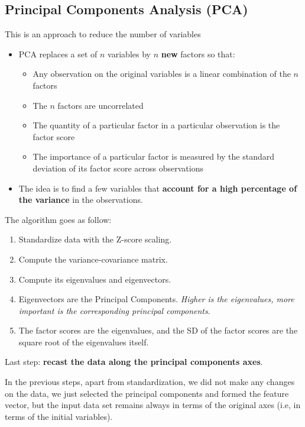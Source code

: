 \subsection{Principal Components Analysis (PCA)}

This is an approach to reduce the number of variables
\begin{itemize}
    \item PCA replaces a set of $n$ variables by $n$ \textbf{new} factors so that:
    \begin{itemize}
        \item Any observation on the original variables is a linear combination of the $n$ factors
        \item The $n$ factors are uncorrelated
        \item The quantity of a particular factor in a particular observation is the factor score
        \item The importance of a particular factor is measured by the standard deviation of its factor score across observations
    \end{itemize}
    \item The idea is to find a few variables that \textbf{account for a high percentage of the variance} in the observations.
\end{itemize}

The algorithm goes as follow:
\begin{enumerate}
    \item Standardize data with the Z-score scaling.
    \item Compute the variance-covariance matrix.
    \item Compute its eigenvalues and eigenvectors.
    \item Eigenvectors are the Principal Components. \textit{Higher is the eigenvalues, more important is the corresponding principal components}.
    \item The factor scores are the eigenvalues, and the SD of the factor scores are the square root of the eigenvalues itself.
\end{enumerate}

Last step: \textbf{recast the data along the principal components axes}.

In the previous steps, apart from standardization, we did not make any changes on the data, we just selected the principal components and formed the feature vector, but the input data set remains always in terms of the original axes (i.e, in terms of the initial variables).

